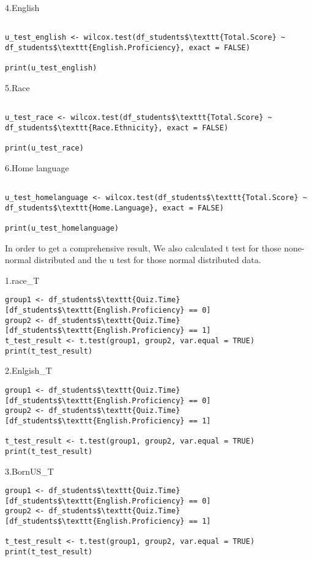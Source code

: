 4.English 
\begin{verbatim}

u_test_english <- wilcox.test(df_students$\texttt{Total.Score} ~ df_students$\texttt{English.Proficiency}, exact = FALSE)

print(u_test_english)

\end{verbatim}

5.Race
\begin{verbatim}

u_test_race <- wilcox.test(df_students$\texttt{Total.Score} ~ df_students$\texttt{Race.Ethnicity}, exact = FALSE)

print(u_test_race)

\end{verbatim}

6.Home language
\begin{verbatim}

u_test_homelanguage <- wilcox.test(df_students$\texttt{Total.Score} ~ df_students$\texttt{Home.Language}, exact = FALSE)

print(u_test_homelanguage)

\end{verbatim}
In order to get a comprehensive result, We also calculated  t test for those none-normal distributed and the u test for those normal distributed data.


1.race_T
\begin{verbatim}
group1 <- df_students$\texttt{Quiz.Time}[df_students$\texttt{English.Proficiency} == 0]
group2 <- df_students$\texttt{Quiz.Time}[df_students$\texttt{English.Proficiency} == 1]
t_test_result <- t.test(group1, group2, var.equal = TRUE)  
print(t_test_result)
\end{verbatim}

2.Enlgish_T
\begin{verbatim}
group1 <- df_students$\texttt{Quiz.Time}[df_students$\texttt{English.Proficiency} == 0]
group2 <- df_students$\texttt{Quiz.Time}[df_students$\texttt{English.Proficiency} == 1]

t_test_result <- t.test(group1, group2, var.equal = TRUE)  
print(t_test_result)
\end{verbatim}

3.BornUS_T
\begin{verbatim}
group1 <- df_students$\texttt{Quiz.Time}[df_students$\texttt{English.Proficiency} == 0]
group2 <- df_students$\texttt{Quiz.Time}[df_students$\texttt{English.Proficiency} == 1]

t_test_result <- t.test(group1, group2, var.equal = TRUE)  
print(t_test_result)
\end{verbatim}

